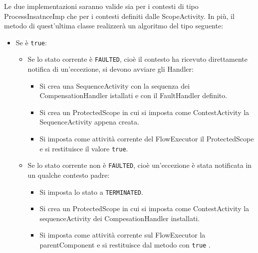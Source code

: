Le due implementazioni saranno valide sia per i contesti di tipo
ProcessInsatnceImp che per i contesti definiti dalle ScopeActivity. In più, il
metodo  di quest'ultima classe realizzerà un algoritmo del
tipo seguente:

\begin{itemize}
  \item Se  \`e \texttt{true}:
  	\begin{itemize}
    	\item Se lo stato corrente \`e \texttt{FAULTED}, cioè il contesto ha
    	ricevuto direttamente notifica di un'eccezione, si devono avviare gli
    	Handler:
    		 \begin{itemize}
             	\item Si crea una SequenceActivity con la sequenza dei
             	CompensationHandler istallati e con il FaultHandler definito.
             	\item Si crea un ProtectedScope in cui si imposta come
             	ContestActivity la SequenceActivity appena creata.
             	\item Si imposta come attività corrente del FlowExecutor il
             	ProtectedScope e si restituisce il valore \texttt{true}.
             \end{itemize}    
    	\item Se lo stato corrente non \`e \texttt{FAULTED}, cioè un'eccezione
    	\`e stata notificata in un qualche contesto padre:
    		 \begin{itemize}
             	\item Si imposta lo stato a \texttt{TERMINATED}.
             	\item Si crea un ProtectedScope in cui si imposta come
             	ContestActivity la sequenceActivity dei CompesationHandler
             	installati. 
             	\item Si imposta come attività corrente sul FlowExecutor la
                parentComponent e si restituisce dal metodo con
                \texttt{true}
				.
             \end{itemize}
    \end{itemize}    
  

\end{itemize}
